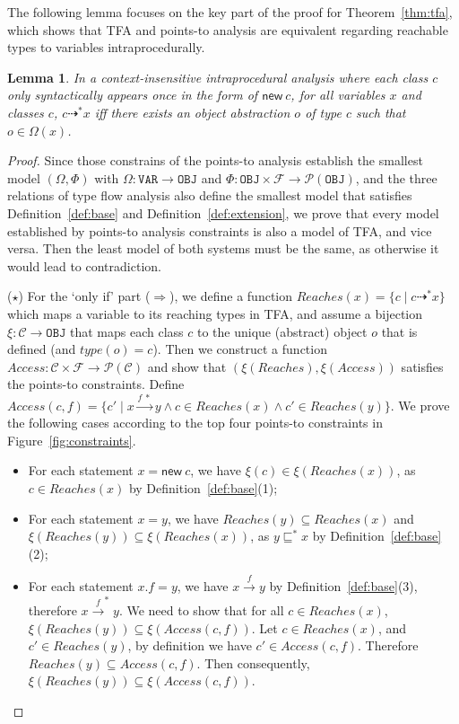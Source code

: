 \documentclass{fac}
\newtheorem{Lemma}{Lemma}
\newcommand{\keyword}[1]{\mathsf{#1}}
\newcommand{\kwnew}[0]{\keyword{new}}
\newcommand\Var{\mathtt{VAR}}
\newcommand\Obj{\mathtt{OBJ}}
\newcommand{\VPT}{\Omega}
\newcommand{\HPT}{\Phi}
\newcommand{\Class}{\mathcal{C}}
\newcommand{\Field}{\mathcal{F}}
\newcommand{\less}{\sqsubseteq}
\newcommand{\tflow}{\dashrightarrow}
\newcommand{\hflow}{\longrightarrow}
\newcommand{\lhflow}[1]{\stackrel{#1}{\hflow}}
\newcommand\set[1]{\{#1\}}
\newcommand\power{\mathcal{P}}
\begin{document}
The following lemma focuses on the key part of the proof for Theorem~\ref{thm:tfa}, which shows that TFA and points-to analysis are equivalent regarding reachable types to variables intraprocedurally.

\begin{Lemma}\label{lem:tfa-intra}
In a context-insensitive intraprocedural analysis where each class $c$ only syntactically appears once in the form of $\kwnew\ c$, for all variables $x$ and classes $c$, $c\tflow^*x$ iff there exists an object abstraction $o$ of type $c$ such that $o\in\VPT(x)$.
\end{Lemma}
\begin{proof}
Since those constrains of the points-to analysis establish the smallest model $(\VPT, \HPT)$ with $\VPT:\Var\rightarrow\Obj$ and $\HPT:\Obj\times\Field\rightarrow\power(\Obj)$, and the three relations of type flow analysis also define the smallest model that satisfies Definition~\ref{def:base} and Definition~\ref{def:extension}, we prove that every model established by points-to analysis constraints is also a model of TFA, and vice versa. Then the least model of both systems must be the same, as otherwise it would lead to contradiction.

\medskip

($\star$) For the `only if' part ($\Rightarrow$), we define a function $Reaches(x)=\set{c\mid c\tflow^* x}$ which maps a variable to its reaching types in TFA, and assume a bijection $\xi:\Class\rightarrow\Obj$ that maps each class $c$ to the unique (abstract) object $o$ that is defined (and $type(o)=c$). Then we construct a function $Access:\Class\times\Field\rightarrow\power(\Class)$ and show that $(\xi(Reaches),\xi(Access))$ satisfies the points-to constraints. Define $Access(c,f)=\set{c'\mid x\lhflow{f\ *}y\wedge c\in Reaches(x)\wedge c'\in Reaches(y)}$. We prove the following cases according to the top four points-to constraints in Figure~\ref{fig:constraints}.
\begin{itemize}
\item For each statement $x = \kwnew\ c$, we have $\xi(c)\in\xi(Reaches(x))$, as $c\in Reaches(x)$ by Definition~\ref{def:base}(1);
\item For each statement $x = y$, we have $Reaches(y)\subseteq Reaches(x)$ and $\xi(Reaches(y))\subseteq\xi(Reaches(x))$, as $y\less^*x$ by Definition~\ref{def:base}(2);
\item For each statement $x.f = y$, we have $x\lhflow{f}y$ by Definition~\ref{def:base}(3), therefore $x\lhflow{f}^*y$. We need to show that for all $c\in Reaches(x)$, $\xi(Reaches(y))\subseteq \xi(Access(c,f))$.
      Let $c\in Reaches(x)$, and $c'\in Reaches(y)$, by definition we have $c'\in Access(c,f)$. Therefore $Reaches(y)\subseteq Access(c,f)$. Then consequently,
      $\xi(Reaches(y))\subseteq \xi(Access(c,f))$.


\end{itemize}
\end{proof}
\end{document}
